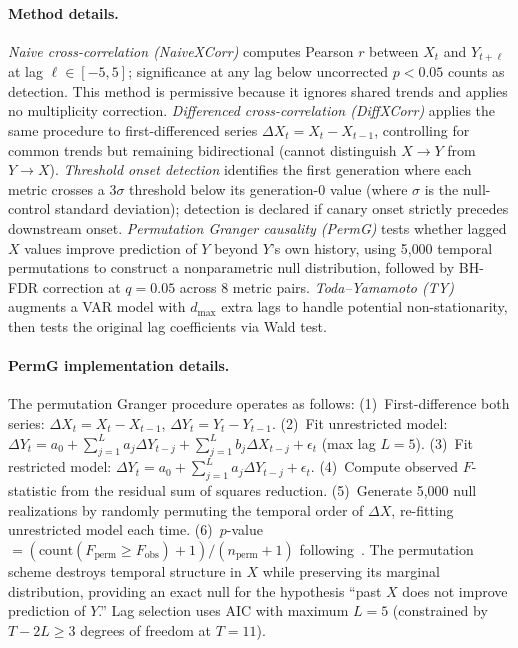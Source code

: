 \paragraph{Method details.}
\emph{Naive cross-correlation (NaiveXCorr)} computes Pearson $r$ between $X_{t}$ and $Y_{t+\ell}$ at lag $\ell \in [-5, 5]$; significance at any lag below uncorrected $p{<}0.05$ counts as detection.
This method is permissive because it ignores shared trends and applies no multiplicity correction.
\emph{Differenced cross-correlation (DiffXCorr)} applies the same procedure to first-differenced series $\Delta X_t = X_t - X_{t-1}$, controlling for common trends but remaining bidirectional (cannot distinguish $X \to Y$ from $Y \to X$).
\emph{Threshold onset detection} identifies the first generation where each metric crosses a $3\sigma$ threshold below its generation-0 value (where $\sigma$ is the null-control standard deviation); detection is declared if canary onset strictly precedes downstream onset.
\emph{Permutation Granger causality (PermG)} tests whether lagged $X$ values improve prediction of $Y$ beyond $Y$'s own history, using 5{,}000 temporal permutations to construct a nonparametric null distribution, followed by BH-FDR correction at $q{=}0.05$ across 8 metric pairs.
\emph{Toda--Yamamoto (TY)} augments a VAR model with $d_{\max}$ extra lags to handle potential non-stationarity, then tests the original lag coefficients via Wald test.

\paragraph{PermG implementation details.}
The permutation Granger procedure operates as follows:
(1)~First-difference both series: $\Delta X_t = X_t - X_{t-1}$, $\Delta Y_t = Y_t - Y_{t-1}$.
(2)~Fit unrestricted model: $\Delta Y_t = a_0 + \sum_{j=1}^{L} a_j \Delta Y_{t-j} + \sum_{j=1}^{L} b_j \Delta X_{t-j} + \epsilon_t$ (max lag $L{=}5$).
(3)~Fit restricted model: $\Delta Y_t = a_0 + \sum_{j=1}^{L} a_j \Delta Y_{t-j} + \epsilon_t$.
(4)~Compute observed $F$-statistic from the residual sum of squares reduction.
(5)~Generate 5{,}000 null realizations by randomly permuting the temporal order of $\Delta X$, re-fitting unrestricted model each time.
(6)~$p$-value $= (\text{count}(F_{\text{perm}} \geq F_{\text{obs}}) + 1) / (n_{\text{perm}} + 1)$ following~\citet{phipson2010permutation}.
The permutation scheme destroys temporal structure in $X$ while preserving its marginal distribution, providing an exact null for the hypothesis ``past $X$ does not improve prediction of $Y$.''
Lag selection uses AIC with maximum $L{=}5$ (constrained by $T{-}2L \geq 3$ degrees of freedom at $T{=}11$).

